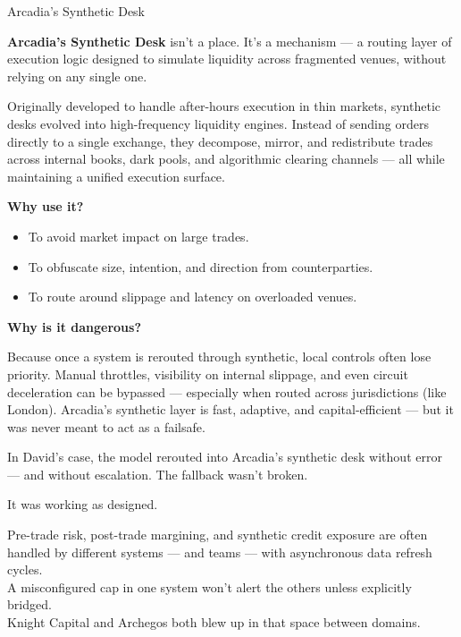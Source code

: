\medskip

\begin{HistoricalSidebar}{Arcadia’s Synthetic Desk}

  \textbf{Arcadia’s Synthetic Desk} isn’t a place. It’s a mechanism — a routing layer of execution logic designed to simulate liquidity across fragmented venues, without relying on any single one.
  
  \medskip
  
  Originally developed to handle after-hours execution in thin markets, synthetic desks evolved into high-frequency liquidity engines. Instead of sending orders directly to a single exchange, they decompose, mirror, and redistribute trades across internal books, dark pools, and algorithmic clearing channels — all while maintaining a unified execution surface.
  
  \medskip
  
  \textbf{Why use it?}
  \begin{itemize}
    \item To avoid market impact on large trades.
    \item To obfuscate size, intention, and direction from counterparties.
    \item To route around slippage and latency on overloaded venues.
  \end{itemize}
  
  \medskip
  
  \textbf{Why is it dangerous?}
  
  Because once a system is rerouted through synthetic, local controls often lose priority. Manual throttles, visibility on internal slippage, and even circuit deceleration can be bypassed — especially when routed across jurisdictions (like London). Arcadia’s synthetic layer is fast, adaptive, and capital-efficient — but it was never meant to act as a failsafe.
  
  \medskip
  
  In David’s case, the model rerouted into Arcadia’s synthetic desk without error — and without escalation. The fallback wasn’t broken.
  
  It was working as designed.
  
\end{HistoricalSidebar}

\medskip

\begin{tcolorbox}[title=Fragmented Risk Systems, colback=gray!5, colframe=black]
Pre-trade risk, post-trade margining, and synthetic credit exposure are often handled by different systems — and teams — with asynchronous data refresh cycles.\\
A misconfigured cap in one system won’t alert the others unless explicitly bridged.\\
Knight Capital and Archegos both blew up in that space between domains.
\end{tcolorbox}



